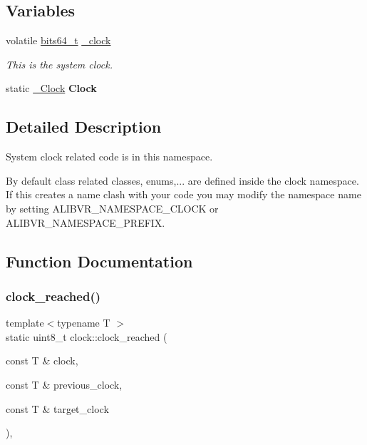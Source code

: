 \subsection*{Variables}
\begin{DoxyCompactItemize}
\item 
volatile \hyperlink{unionbits64__s}{bits64\+\_\+t} \hyperlink{namespaceclock_a0cfce972d3684eddb3dd61bb0baaf225}{\+\_\+clock}
\begin{DoxyCompactList}\small\item\em This is the system clock. \end{DoxyCompactList}\item 
\hypertarget{namespaceclock_a8414359d2fd2b9f75143850c0e3bb4b5}{}\label{namespaceclock_a8414359d2fd2b9f75143850c0e3bb4b5} 
static \hyperlink{classclock_1_1__Clock}{\+\_\+\+Clock} {\bfseries Clock}
\end{DoxyCompactItemize}


\subsection{Detailed Description}
System clock related code is in this namespace. 

By default class related classes, enums,... are defined inside the {\ttfamily clock} namespace. If this creates a name clash with your code you may modify the namespace name by setting A\+L\+I\+B\+V\+R\+\_\+\+N\+A\+M\+E\+S\+P\+A\+C\+E\+\_\+\+C\+L\+O\+CK or A\+L\+I\+B\+V\+R\+\_\+\+N\+A\+M\+E\+S\+P\+A\+C\+E\+\_\+\+P\+R\+E\+F\+IX. 

\subsection{Function Documentation}
\hypertarget{namespaceclock_a107ad02a77763be28bf63d43c566cf75}{}\label{namespaceclock_a107ad02a77763be28bf63d43c566cf75} 
\subsubsection{\texorpdfstring{clock\+\_\+reached()}{clock\_reached()}\hspace{0.1cm}{\footnotesize\ttfamily [1/4]}}
{\footnotesize\ttfamily template$<$typename T $>$ \\
static uint8\+\_\+t clock\+::clock\+\_\+reached (\begin{DoxyParamCaption}\item[{const T \&}]{clock,  }\item[{const T \&}]{previous\+\_\+clock,  }\item[{const T \&}]{target\+\_\+clock }\end{DoxyParamCaption})\hspace{0.3cm}{\ttfamily [inline]}, {\ttfamily [static]}}



